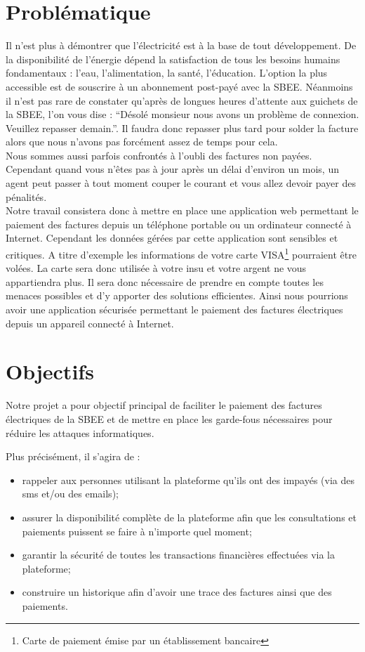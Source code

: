     \section{Problématique}
    \small{
	Il n'est plus \`a d\'emontrer que l'\'electricit\'e est \`a la base de tout d\'eveloppement. De la disponibilité de l’énergie dépend la satisfaction de tous les besoins humains fondamentaux : l’eau, l’alimentation, la santé, l’éducation. L'option la plus accessible est de souscrire \`a un abonnement post-pay\'e avec la SBEE.
	N\'eanmoins il n'est pas rare de constater qu'apr\`es de longues heures d'attente aux guichets de la SBEE, l'on vous dise : ``D\'esol\'e monsieur nous avons un probl\`eme de connexion. Veuillez repasser demain.''. Il faudra donc repasser plus tard pour solder la facture alors que nous n'avons pas forc\'ement assez de temps pour cela. \\
	Nous sommes aussi parfois confront\'es \`a l'oubli des factures non pay\'ees. Cependant quand vous n'\^etes pas \`a jour apr\`es un d\'elai d'environ un mois, un agent peut passer \`a tout moment couper le courant et vous allez devoir payer des p\'enalit\'es.\\
	Notre travail consistera donc \`a mettre en place une application web permettant le paiement des factures depuis un t\'el\'ephone portable ou un ordinateur connect\'e \`a Internet. Cependant les donn\'ees g\'er\'ees par cette application sont sensibles et critiques. A titre d'exemple les informations de votre carte VISA\footnote{Carte de paiement émise par un établissement bancaire} pourraient \^etre vol\'ees. La carte sera donc utilis\'ee \`a votre insu et votre argent ne vous appartiendra plus. Il sera donc nécessaire de prendre en compte toutes les menaces possibles et d'y apporter des solutions efficientes. Ainsi nous pourrions avoir une application s\'ecuris\'ee permettant le paiement des factures \'electriques depuis un appareil connect\'e \`a Internet.
	}

    \section{Objectifs}
    \small{ 
	  Notre projet a pour objectif principal de faciliter le paiement des factures \'electriques de la SBEE et de mettre en place les garde-fous nécessaires pour réduire les attaques informatiques.
	        
	  Plus précisément, il s'agira de :
	
    \begin{itemize}
	\item rappeler aux personnes utilisant la plateforme qu'ils ont des impay\'es (via des \gls{sms} et/ou des emails);
        \item assurer la disponibilit\'e compl\`ete de la plateforme afin que les consultations et paiements puissent se faire \`a n'importe quel moment;
	\item garantir la s\'ecurit\'e de toutes les transactions financi\`eres effectu\'ees via la plateforme;
	\item construire un historique afin d'avoir une trace des factures ainsi que des paiements.
    \end{itemize}
    }

